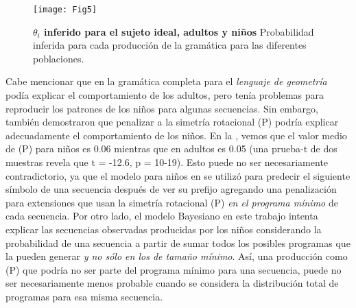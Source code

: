 \begin{figure}[!ht]
    \centering
    \texttt{[image: Fig5]}
    \caption{{\bf $\theta_i$ inferido para el sujeto ideal, adultos y niños} Probabilidad inferida para cada producción de la gramática para las diferentes poblaciones.}
    \label{fig:adultVsChildren}
\end{figure}


Cabe mencionar que en \cite{marie2016} la gramática completa para el \textit{lenguaje de geometría} podía explicar el comportamiento de los adultos, pero tenía problemas para reproducir los patrones de los niños para algunas secuencias. Sin embargo, también demostraron que penalizar a la simetría rotacional (P) podría explicar adecuadamente el comportamiento de los niños. En la , vemos que el valor medio de (P) para niños es 0.06 mientras que en adultos es 0.05 (una prueba-t de dos muestras revela que t = -12.6, p = 10-19). Esto puede no ser necesariamente contradictorio, ya que el modelo para niños en \cite{marie2016} se utilizó para predecir el siguiente símbolo de una secuencia después de ver su prefijo agregando una penalización para extensiones que usan la simetría rotacional (P) \textit{en el programa mínimo} de cada secuencia. Por otro lado, el modelo Bayesiano en este trabajo intenta explicar las secuencias observadas producidas por los niños considerando la probabilidad de una secuencia a partir de sumar todos los posibles programas que la pueden generar \textit{y no sólo en los de tamaño mínimo}. Así, una producción como (P) que podría no ser parte del programa mínimo para una secuencia, puede no ser necesariamente menos probable cuando se considera la distribución total de programas para esa misma secuencia.

